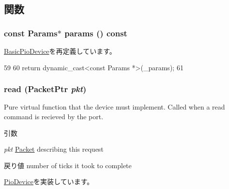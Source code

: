 \subsection{関数}
\hypertarget{classDumbTOD_acd3c3feb78ae7a8f88fe0f110a718dff}{
\subsubsection[{params}]{\setlength{\rightskip}{0pt plus 5cm}const {\bf Params}$\ast$ params () const}}
\label{classDumbTOD_acd3c3feb78ae7a8f88fe0f110a718dff}


\hyperlink{classBasicPioDevice_acd3c3feb78ae7a8f88fe0f110a718dff}{BasicPioDevice}を再定義しています。


\begin{DoxyCode}
59     {
60         return dynamic_cast<const Params *>(_params);
61     }
\end{DoxyCode}
\hypertarget{classDumbTOD_a613ec7d5e1ec64f8d21fec78ae8e568e}{
\subsubsection[{read}]{ read ({\bf PacketPtr} {\em pkt})}}
\label{classDumbTOD_a613ec7d5e1ec64f8d21fec78ae8e568e}
Pure virtual function that the device must implement. Called when a read command is recieved by the port. 
\begin{DoxyParams}{引数}
\item[{\em pkt}]\hyperlink{classPacket}{Packet} describing this request \end{DoxyParams}
\begin{DoxyReturn}{戻り値}
number of ticks it took to complete 
\end{DoxyReturn}


\hyperlink{classPioDevice_a842312590432036092c422c87a442358}{PioDevice}を実装しています。


